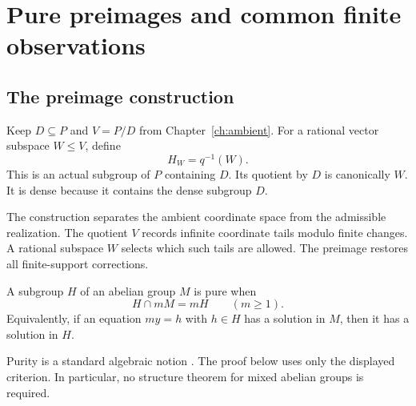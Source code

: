 \chapter{Pure preimages and common finite observations}
\label{ch:purity}

\section{The preimage construction}
Keep $D\subseteq P$ and $V=P/D$ from Chapter~\ref{ch:ambient}. For a rational vector subspace $W\le V$, define
\[
H_W=q^{-1}(W).
\]
This is an actual subgroup of $P$ containing $D$. Its quotient by $D$ is canonically $W$. It is dense because it contains the dense subgroup $D$.

The construction separates the ambient coordinate space from the admissible realization. The quotient $V$ records infinite coordinate tails modulo finite changes. A rational subspace $W$ selects which such tails are allowed. The preimage restores all finite-support corrections.

\begin{definition}[Purity]
A subgroup $H$ of an abelian group $M$ is pure when
\[
H\cap mM=mH\qquad(m\ge1).
\]
Equivalently, if an equation $my=h$ with $h\in H$ has a solution in $M$, then it has a solution in $H$.
\end{definition}
Purity is a standard algebraic notion \cite{Fuchs}. The proof below uses only the displayed criterion. In particular, no structure theorem for mixed abelian groups is required.

